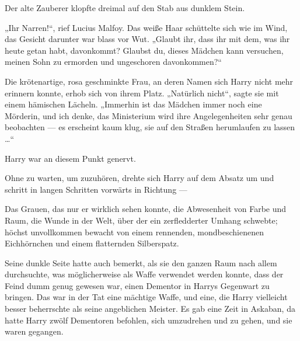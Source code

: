 Der alte Zauberer klopfte dreimal auf den Stab aus dunklem Stein.

„Ihr Narren!“, rief Lucius Malfoy.
Das weiße Haar schüttelte sich wie im Wind, das Gesicht darunter war blass vor Wut.
„Glaubt ihr, dass ihr mit dem, was ihr heute getan habt, davonkommt? Glaubst du, dieses Mädchen kann versuchen, meinen Sohn zu ermorden und ungeschoren davonkommen?“

Die krötenartige, rosa geschminkte Frau, an deren Namen sich Harry nicht mehr erinnern konnte, erhob sich von ihrem Platz.
„Natürlich nicht“, sagte sie mit einem hämischen Lächeln.
„Immerhin ist das Mädchen immer noch eine Mörderin, und ich denke, das Ministerium wird ihre Angelegenheiten sehr genau beobachten — es erscheint kaum klug, sie auf den Straßen herumlaufen zu lassen …“

Harry war an diesem Punkt genervt.

Ohne zu warten, um zuzuhören, drehte sich Harry auf dem Absatz um und schritt in langen Schritten vorwärts in Richtung —

Das Grauen, das nur er wirklich sehen konnte, die Abwesenheit von Farbe und Raum, die Wunde in der Welt, über der ein zerfledderter Umhang schwebte; höchst unvollkommen bewacht von einem rennenden, mondbeschienenen Eichhörnchen und einem flatternden Silberspatz.

Seine dunkle Seite hatte auch bemerkt, als sie den ganzen Raum nach allem durchsuchte, was möglicherweise als Waffe verwendet werden konnte, dass der Feind dumm genug gewesen war, einen Dementor in Harrys Gegenwart zu bringen. Das war in der Tat eine mächtige Waffe, und eine, die Harry vielleicht besser beherrschte als seine angeblichen Meister. Es gab eine Zeit in Askaban, da hatte Harry zwölf Dementoren befohlen, sich umzudrehen und zu gehen, und sie waren gegangen.

